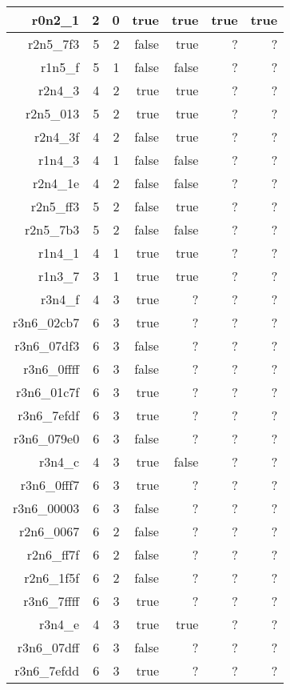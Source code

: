\begin{center}
\begin{longtable}{rrrrrrr}
  r0n2\_1 & 2 & 0 & true & true & true & true \\ \hline
  r2n5\_7f3 & 5 & 2 & false & true & ? & ? \\ \hline
  r1n5\_f & 5 & 1 & false & false & ? & ? \\ \hline
  r2n4\_3 & 4 & 2 & true & true & ? & ? \\ \hline
  r2n5\_013 & 5 & 2 & true & true & ? & ? \\ \hline
  r2n4\_3f & 4 & 2 & false & true & ? & ? \\ \hline
  r1n4\_3 & 4 & 1 & false & false & ? & ? \\ \hline
  r2n4\_1e & 4 & 2 & false & false & ? & ? \\ \hline
  r2n5\_ff3 & 5 & 2 & false & true & ? & ? \\ \hline
  r2n5\_7b3 & 5 & 2 & false & false & ? & ? \\ \hline
  r1n4\_1 & 4 & 1 & true & true & ? & ? \\ \hline
  r1n3\_7 & 3 & 1 & true & true & ? & ? \\ \hline
  r3n4\_f & 4 & 3 & true & ? & ? & ? \\ \hline
  r3n6\_02cb7 & 6 & 3 & true & ? & ? & ? \\ \hline
  r3n6\_07df3 & 6 & 3 & false & ? & ? & ? \\ \hline
  r3n6\_0ffff & 6 & 3 & false & ? & ? & ? \\ \hline
  r3n6\_01c7f & 6 & 3 & true & ? & ? & ? \\ \hline
  r3n6\_7efdf & 6 & 3 & true & ? & ? & ? \\ \hline
  r3n6\_079e0 & 6 & 3 & false & ? & ? & ? \\ \hline
  r3n4\_c & 4 & 3 & true & false & ? & ? \\ \hline
  r3n6\_0fff7 & 6 & 3 & true & ? & ? & ? \\ \hline
  r3n6\_00003 & 6 & 3 & false & ? & ? & ? \\ \hline
  r2n6\_0067 & 6 & 2 & false & ? & ? & ? \\ \hline
  r2n6\_ff7f & 6 & 2 & false & ? & ? & ? \\ \hline
  r2n6\_1f5f & 6 & 2 & false & ? & ? & ? \\ \hline
  r3n6\_7ffff & 6 & 3 & true & ? & ? & ? \\ \hline
  r3n4\_e & 4 & 3 & true & true & ? & ? \\ \hline
  r3n6\_07dff & 6 & 3 & false & ? & ? & ? \\ \hline
  r3n6\_7efdd & 6 & 3 & true & ? & ? & ? \\ \hline

\end{longtable}
\end{center}
